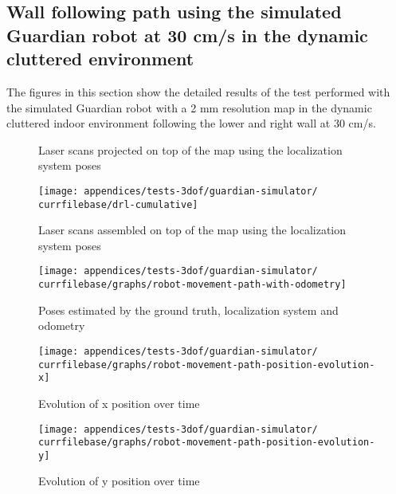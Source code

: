 \subsection{Wall following path using the simulated Guardian robot at 30 cm/s in the dynamic cluttered environment}\label{subsec:appendix-a_guardian-simulator-tests_wall-following-path-using-the-simulated-guardian-robot-at-30-cm-s-in-dynamic-cluttered-environment}

The figures in this section show the detailed results of the test performed with the simulated Guardian robot with a 2 mm resolution map in the dynamic cluttered indoor environment following the lower and right wall at 30 cm/s.


\begin{figure}[H]
	\centering
	\caption{Laser scans projected on top of the map using the localization system poses}
\end{figure}


\begin{figure}[H]
	\centering
	\texttt{[image: appendices/tests-3dof/guardian-simulator/\\currfilebase/drl-cumulative]}
	\caption{Laser scans assembled on top of the map using the localization system poses}
\end{figure}


\begin{figure}[H]
	\centering
	\texttt{[image: appendices/tests-3dof/guardian-simulator/\\currfilebase/graphs/robot-movement-path-with-odometry]}
	\caption{Poses estimated by the ground truth, localization system and odometry}
\end{figure}

\begin{figure}[H]
	\centering
	\texttt{[image: appendices/tests-3dof/guardian-simulator/\\currfilebase/graphs/robot-movement-path-position-evolution-x]}
	\caption{Evolution of x position over time}
\end{figure}

\begin{figure}[H]
	\centering
	\texttt{[image: appendices/tests-3dof/guardian-simulator/\\currfilebase/graphs/robot-movement-path-position-evolution-y]}
	\caption{Evolution of y position over time}
\end{figure}


